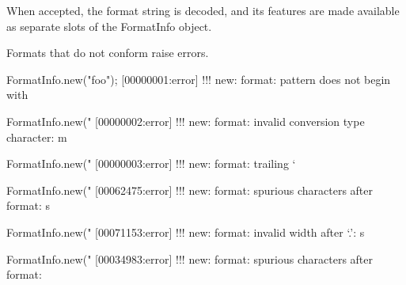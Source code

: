 When accepted, the format string is decoded, and its features are made
available as separate slots of the FormatInfo object.


Formats that do not conform raise errors.

\begin{urbiscript}
FormatInfo.new("foo");
[00000001:error] !!! new: format: pattern does not begin with %

FormatInfo.new("%
[00000002:error] !!! new: format: invalid conversion type character: m

FormatInfo.new("%
[00000003:error] !!! new: format: trailing `%

FormatInfo.new("%
[00062475:error] !!! new: format: spurious characters after format: s

FormatInfo.new("%
[00071153:error] !!! new: format: invalid width after `.': s

FormatInfo.new("%
[00034983:error] !!! new: format: spurious characters after format: %
\end{urbiscript}



